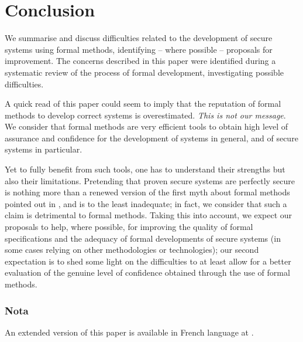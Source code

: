 \documentclass[conference]{IEEEtran}
\begin{document}
\section{Conclusion}\label{conclusion}

We summarise and discuss difficulties related to the development of secure systems using
formal methods, identifying -- where possible -- proposals for improvement. The concerns
described in this paper were identified during a systematic review of the process of formal
development, investigating possible difficulties.

A quick read of this paper could seem to imply that the reputation of formal methods to
develop correct systems is overestimated. \emph{This is not our message}. We consider that
formal methods are very efficient tools to obtain high level of assurance and confidence for
the development of systems in general, and of secure systems in particular.

Yet to fully benefit from such tools, one has to understand their strengths but also their
limitations. Pretending that proven secure systems are perfectly secure is nothing more than
a renewed version of the first myth about formal methods pointed out in
\cite{10.1109/52.57887}, and is to the least inadequate; in fact, we consider that such a
claim is detrimental to formal methods. Taking this into account, we expect our proposals to
help, where possible, for improving the quality of formal specifications and the adequacy of
formal developments of secure systems (in some cases relying on other methodologies or
technologies); our second expectation is to shed some light on the difficulties to at least
allow for a better evaluation of the genuine level of confidence obtained through the use of
formal methods.

\subsubsection*{Nota}{\small An extended version of this paper is available in French language
at \cite{ssigouv}}.











\end{document}
